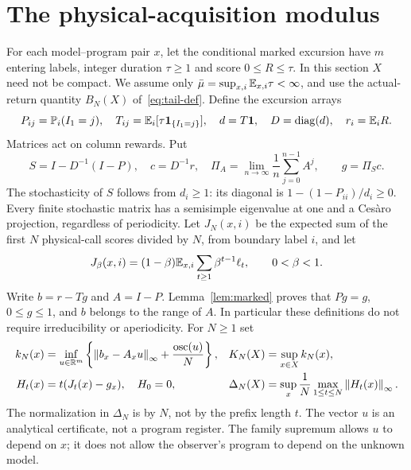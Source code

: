 \section{The physical-acquisition modulus}\label{sec:modulus}
For each model--program pair $x$, let the conditional marked excursion have $m$ entering labels, integer duration $\tau\ge1$ and score $0\le R\le\tau$. In this section $X$ need not be compact. We assume only $\bar\mu=\sup_{x,i}\mathbb E_{x,i}\tau<\infty$, and use the actual-return quantity $B_N(X)$ of~\eqref{eq:tail-def}. Define the excursion arrays
\begin{equation}\label{eq:arrays}
 P_{ij}=\mathbb P_i(I_1=j),\quad T_{ij}=\mathbb E_i[\tau\mathbf 1_{\{I_1=j\}}],\quad
 d=T\mathbf 1,\quad D=\operatorname{diag}(d),\quad r_i=\mathbb E_iR.
\end{equation}
Matrices act on column rewards. Put
\begin{equation}\label{eq:time-change}
 S=I-D^{-1}(I-P),\quad c=D^{-1}r,\quad
 \Pi_A=\lim_{n\to\infty}\frac1n\sum_{j=0}^{n-1}A^j,
 \qquad g=\Pi_Sc.
\end{equation}
The stochasticity of $S$ follows from $d_i\ge1$: its diagonal is $1-(1-P_{ii})/d_i\ge0$. Every finite stochastic matrix has a semisimple eigenvalue at one and a Ces\`aro projection, regardless of periodicity. Let $J_N(x,i)$ be the expected sum of the first $N$ physical-call scores divided by $N$, from boundary label $i$, and let
\[
 J_\beta(x,i)=(1-\beta)\mathbb E_{x,i}\sum_{t\ge1}\beta^{t-1}\ell_t,
 \qquad 0<\beta<1.
\]
Write $b=r-Tg$ and $A=I-P$. Lemma~\ref{lem:marked} proves that $Pg=g$, $0\le g\le1$, and $b$ belongs to the range of $A$. In particular these definitions do not require irreducibility or aperiodicity. For $N\ge1$ set
\begin{align}
 k_N(x)&=\inf_{u\in\mathbb R^m}\left\{\left\lVert b_x-A_xu\right\rVert_\infty+\frac{\operatorname{osc}(u)}N\right\},
 & K_N(X)&=\sup_{x\in X}k_N(x),\label{eq:modulus-primal}\\
 H_t(x)&=t(J_t(x)-g_x),\quad H_0=0,
 &\Delta_N(X)&=\sup_x\frac1N\max_{1\le t\le N}\left\lVert H_t(x)\right\rVert_\infty.\label{eq:prefix-modulus}
\end{align}
The normalization in $\Delta_N$ is by $N$, not by the prefix length $t$. The vector $u$ is an analytical certificate, not a program register. The family supremum allows $u$ to depend on $x$; it does not allow the observer's program to depend on the unknown model.

